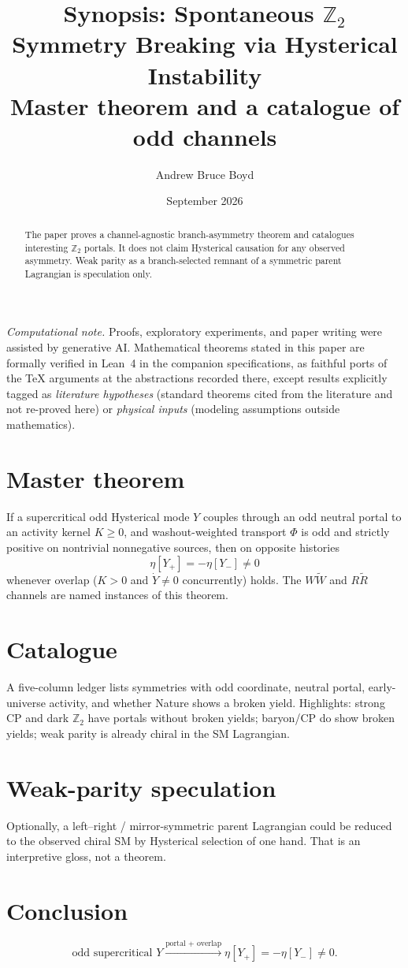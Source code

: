 \documentclass[11pt]{article}
\title{\textbf{Synopsis: Spontaneous $\mathbb Z_2$ Symmetry Breaking via Hysterical Instability}\\[0.35em]
\large Master theorem and a catalogue of odd channels}
\author{Andrew Bruce Boyd}
\date{September 2026}
\theoremstyle{definition}
\theoremstyle{remark}
\begin{document}
\maketitle
\noindent\textit{Computational note.}
Proofs, exploratory experiments, and paper writing were assisted by generative AI.
Mathematical theorems stated in this paper are formally verified in Lean~4 in the
companion specifications, as faithful ports of the TeX arguments at the abstractions
recorded there, except results explicitly tagged as \emph{literature hypotheses}
(standard theorems cited from the literature and not re-proved here) or
\emph{physical inputs} (modeling assumptions outside mathematics).

\begin{abstract}
The paper proves a channel-agnostic branch-asymmetry theorem and catalogues
interesting $\mathbb Z_2$ portals.
It does not claim Hysterical causation for any observed asymmetry.
Weak parity as a branch-selected remnant of a symmetric parent Lagrangian is
speculation only.
\end{abstract}

\section{Master theorem}
If a supercritical odd Hysterical mode $Y$ couples through an odd neutral portal
to an activity kernel $K\ge0$, and washout-weighted transport $\Phi$ is odd and
strictly positive on nontrivial nonnegative sources, then on opposite histories
\[
\eta[Y_+]=-\eta[Y_-]\neq0
\]
whenever overlap ($K>0$ and $\dot Y\neq0$ concurrently) holds.
The $W\widetilde W$ and $R\widetilde R$ channels are named instances of this theorem.

\section{Catalogue}
A five-column ledger lists symmetries with odd coordinate, neutral portal,
early-universe activity, and whether Nature shows a broken yield.
Highlights: strong CP and dark $\mathbb Z_2$ have portals without broken yields;
baryon/CP do show broken yields; weak parity is already chiral in the SM
Lagrangian.

\section{Weak-parity speculation}
Optionally, a left--right / mirror-symmetric parent Lagrangian could be reduced
to the observed chiral SM by Hysterical selection of one hand.
That is an interpretive gloss, not a theorem.

\section{Conclusion}
\[
\text{odd supercritical }Y
\xrightarrow{\text{portal + overlap}}
\eta[Y_+]=-\eta[Y_-]\neq0.
\]
\end{document}
